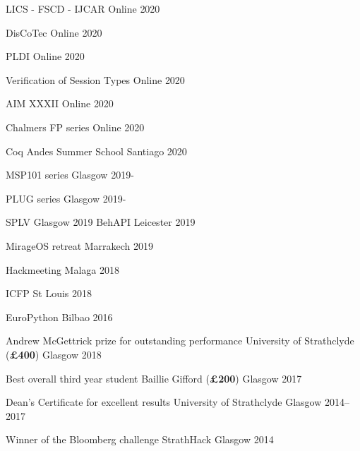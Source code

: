 \documentclass[11pt, a4paper]{awesome-cv}
\begin{document}
\begin{minipage}[t]{0.5\linewidth}
\begin{cvhonors}
  \cvhonor
  {LICS - FSCD - IJCAR}
  {}
  {Online}
  {2020}

  \cvhonor
  {DisCoTec}
  {}
  {Online}
  {2020}

  \cvhonor
  {PLDI}
  {}
  {Online}
  {2020}

  \cvhonor
  {Verification of Session Types}
  {}
  {Online}
  {2020}

  \cvhonor
  {AIM XXXII}
  {}
  {Online}
  {2020}

  \cvhonor
  {Chalmers FP series}
  {}
  {Online}
  {2020}

    \cvhonor
      {Coq Andes Summer School}
      {}
      {Santiago}
      {2020}

      \cvhonor
      {MSP101 series}
      {}
      {Glasgow}
      {2019-}
\end{cvhonors}
\end{minipage}
\hspace{0.05\linewidth}
\begin{minipage}[t]{0.5\linewidth}
\begin{cvhonors}

      \cvhonor
      {PLUG series}
      {}
      {Glasgow}
      {2019-}

      \cvhonor
      {SPLV}
      {}
      {Glasgow}
      {2019}
    \cvhonor
      {BehAPI}
      {}
      {Leicester}
      {2019}

    \cvhonor
      {MirageOS retreat}
      {}
      {Marrakech}
      {2019}

    \cvhonor
      {Hackmeeting}
      {}
      {Malaga}
      {2018}

    \cvhonor
      {ICFP}
      {}
      {St Louis}
      {2018}

    \cvhonor
      {EuroPython}
      {}
      {Bilbao}
      {2016}

\end{cvhonors}
\end{minipage}


\begin{cvhonors}
  \cvhonor
  {Andrew McGettrick prize for outstanding performance} %
  {University of Strathclyde (\textbf{£400})} %
  {Glasgow} %
  {2018} %
  
  \cvhonor
  {Best overall third year student} %
  {Baillie Gifford (\textbf{£200})} %
  {Glasgow} %
  {2017} %
  
  \cvhonor
  {Dean's Certificate for excellent results} %
  {University of Strathclyde} %
  {Glasgow} %
  {2014--2017} %
  
  \cvhonor
  {Winner of the Bloomberg challenge} %
  {StrathHack} %
  {Glasgow} %
  {2014} %
\end{cvhonors}
\end{document}
